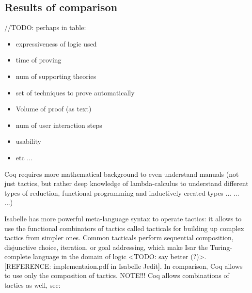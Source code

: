 \documentclass[article]{aaltoseries}
\begin{document}





\subsection{Results of comparison}
\label{sec:joint_comparison}

//TODO: perhaps in table:
\begin{itemize}
	\itemsep0em
	\item expressiveness of logic used
	\item time of proving
	\item num of supporting theories
	\item set of techniques to prove automatically
	\item Volume of proof (as text)
	\item num of user interaction steps
	\item usability
	\item etc ...
\end{itemize}


Coq requires more mathematical background to even understand manuals (not just tactics, but rather deep knowledge of lambda-calculus to understand different types of reduction, functional programming and inductively created types ... ... ...)

Isabelle has more powerful meta-language syntax to operate tactics: it allows to use the functional combinators of tactics called tacticals for building up complex tactics from simpler ones. Common tacticals perform sequential composition, disjunctive choice, iteration, or goal addressing, which make Isar the Turing-complete language in the domain of logic <TODO: say better (?)>. [REFERENCE: implementaion.pdf in Isabelle Jedit]. In comparison, Coq allows to use only the composition of tactics. 
NOTE!!! Coq allows combinations of tactics as well, see: %
\end{document}

